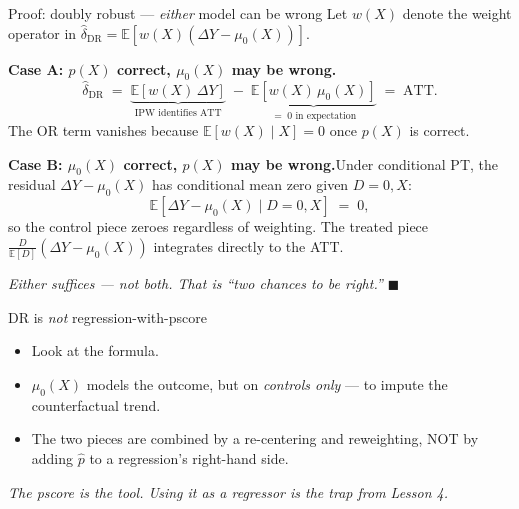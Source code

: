 \documentclass[aspectratio=169,11pt]{beamer}
\begin{document}
\begin{frame}{Proof: doubly robust --- \textit{either} model can be wrong}
\footnotesize
Let $w(X)$ denote the weight operator in $\widehat\delta_{\text{DR}} = \mathbb{E}[w(X)(\Delta Y - \mu_0(X))]$.
\vspace{0.4em}

\textbf{Case A: $p(X)$ correct, $\mu_0(X)$ may be wrong.}
\vspace{-0.2em}
\[
\widehat\delta_{\text{DR}} \;=\; \underbrace{\mathbb{E}[w(X)\,\Delta Y]}_{\text{IPW identifies ATT}}
\;-\; \underbrace{\mathbb{E}[w(X)\,\mu_0(X)]}_{=\;0 \text{ in expectation}} \;=\; \text{ATT.}
\]
The OR term vanishes because $\mathbb{E}[w(X) \mid X] = 0$ once $p(X)$ is correct. 
\vspace{0.5em}

\textbf{Case B: $\mu_0(X)$ correct, $p(X)$ may be wrong.}\;\;Under conditional PT, the residual $\Delta Y - \mu_0(X)$ has conditional mean zero given $D{=}0, X$:
\vspace{-0.2em}
\[
\mathbb{E}[\Delta Y - \mu_0(X) \mid D{=}0, X] \;=\; 0,
\]
\vspace{-0.2em}
so the control piece zeroes regardless of weighting. The treated piece $\tfrac{D}{\mathbb{E}[D]}(\Delta Y - \mu_0(X))$ integrates directly to the ATT. 
\vspace{0.4em}

\begin{center}
\footnotesize\color{warmgray}\itshape
Either suffices --- not both. \;That is ``two chances to be right.'' \;$\blacksquare$
\end{center}
\end{frame}

\begin{frame}{DR is \textit{not} regression-with-pscore}
\vspace{0.4em}
\begin{itemize}
  \item Look at the formula. 
  \item $\mu_0(X)$ models the outcome, but on \textit{controls only} --- to impute the counterfactual trend.
  \item The two pieces are combined by a re-centering and reweighting, NOT by adding $\widehat{p}$ to a regression's right-hand side.
\end{itemize}
\vspace{0.6em}
\begin{center}
\small\color{warmgray}\itshape
The pscore is the tool.  Using it as a regressor is the trap from Lesson 4.
\end{center}
\end{frame}
\end{document}
